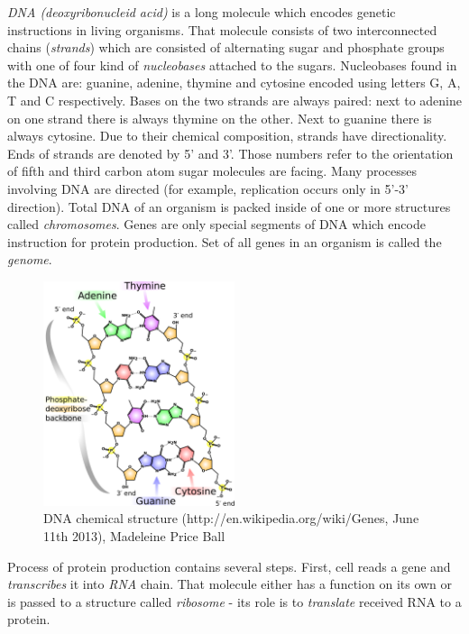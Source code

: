\documentclass[times, utf8, diplomski]{fer}
\begin{document}
\emph{DNA (deoxyribonucleid acid)} is a long molecule which encodes genetic instructions in living organisms. That molecule consists of two interconnected chains (\emph{strands}) which are consisted of alternating sugar and phosphate groups with one of four kind of \emph{nucleobases} attached to the sugars. Nucleobases found in the DNA are: guanine, adenine, thymine and cytosine encoded using letters G, A, T and C respectively. Bases on the two strands are always paired: next to adenine on one strand there is always thymine on the other. Next to guanine there is always cytosine. Due to their chemical composition, strands have directionality. Ends of strands are denoted by 5' and 3'. Those numbers refer to the orientation of fifth and third carbon atom sugar molecules are facing. Many processes involving DNA are directed (for example, replication occurs only in 5'-3' direction). Total DNA of an organism is packed inside of one or more structures called \emph{chromosomes}. Genes are only special segments of DNA which encode instruction for protein production. Set of all genes in an organism is called the \emph{genome}.
\\

\begin{figure}[!ht]
\begin{center}
	\includegraphics[width=0.5\textwidth]{../img/DNA_chemical_structure.pdf}
	\caption{DNA chemical structure (http://en.wikipedia.org/wiki/Genes, June 11th 2013), Madeleine Price Ball}\label{dna.chemical.structure}
\end{center}
\end{figure}

Process of protein production contains several steps. First, cell reads a gene and \emph{transcribes} it into \emph{RNA} chain. That molecule either has a function on its own or is passed to a structure called \emph{ribosome} - its role is to \emph{translate} received RNA to a protein.
\\
\end{document}

